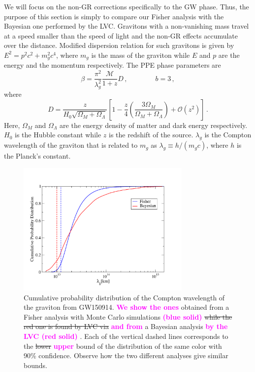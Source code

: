 \documentclass[prd,twocolumn,nofootinbib]{revtex4-1}
\newcommand\be{\begin{equation}}
\newcommand\ee{\end{equation}}
\newcommand{\lb}{\left(}
\newcommand{\rb}{\right)}
\newcommand{\kent}[1]{\textcolor{magenta}{\textbf{#1}} }
\begin{document}


We will focus on the non-GR corrections specifically to the GW phase. Thus, the purpose of this section is simply to compare our Fisher analysis with the Bayesian one performed by the LVC. Gravitons with a non-vanishing mass travel at a speed smaller than the speed of light and the non-GR effects accumulate over the distance. Modified dispersion relation for such gravitons is given by $ E^2=p^2c^2+m_g^2c^4$, where $m_g$ is the mass of the graviton while $E$ and $p$ are the energy and the momentum respectively. The PPE phase parameters are~\cite{Will:1997bb}
\be
\beta=\frac{\pi^2}{\lambda_g^2}\frac{\mathcal{M}}{1+z}D\,, \qquad \qquad b=3\,,
\ee
where
\be
D=\frac{z}{H_0\sqrt{\Omega_M+\Omega_{\Lambda}}}\left[1-\frac{z}{4}\left(\frac{3\Omega_M}{\Omega_M+\Omega_{\Lambda}} \right )+\mathcal{O}(z^2)\right]\,.
\ee
Here, $\Omega_M$ and $\Omega_\Lambda$ are the energy density of matter and dark energy respectively. $H_0$ is the Hubble constant while $z$ is the redshift of the source. $\lambda_g$ is the Compton wavelength of the graviton that is related to $m_g$ as $\lambda_g\equiv h/\lb m_gc\rb$, where $h$ is the Planck's constant.

\begin{figure}[htb]
\includegraphics[width=8.5cm]{graviton.pdf}
\caption{Cumulative probability distribution of the Compton wavelength of the graviton from GW150914. \kent{We show the ones} obtained from a Fisher analysis with Monte Carlo simulations \kent{(blue solid)} \sout{while the red one is found by LVC via} \kent{and from} a Bayesian analysis \kent{by the LVC (red solid)}. Each of the vertical dashed lines corresponds to the \sout{lower} \kent{upper} bound of the distribution of the same color with 90\% confidence. Observe how the two different analyses give similar bounds.}
\label{fig:graviton}
\end{figure}
\end{document}
